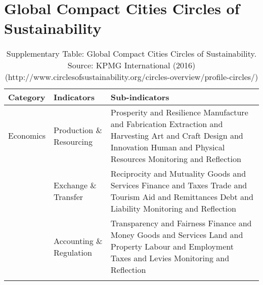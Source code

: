 
\chapter{Global Compact Cities Circles of Sustainability} %

\label{AppendixC} %

\begin{table}[th]
\caption{Supplementary Table: Global Compact Cities Circles of Sustainability. Source: KPMG International (2016) (http://www.circlesofsustainability.org/circles-overview/profile-circles/)}
\begin{center}
\begin{tabular}{ >{\raggedright\arraybackslash}p{} >{\raggedright\arraybackslash}p{} >{\raggedright\arraybackslash}p{} }
\hline
Category & Indicators & Sub-indicators \\
\hline
Economics & Production \& Resourcing & Prosperity and Resilience \linebreak Manufacture and Fabrication \linebreak Extraction and Harvesting \linebreak Art and Craft \linebreak Design and Innovation \linebreak Human and Physical Resources \linebreak Monitoring and Reflection \linebreak \\
  & Exchange \& Transfer & Reciprocity and Mutuality \linebreak Goods and Services \linebreak Finance and Taxes \linebreak Trade and Tourism \linebreak Aid and Remittances \linebreak Debt and Liability \linebreak Monitoring and Reflection  \linebreak \\
  & Accounting \& Regulation & Transparency and Fairness \linebreak Finance and Money \linebreak Goods and Services \linebreak Land and Property \linebreak Labour and Employment \linebreak Taxes and Levies \linebreak Monitoring and Reflection \\
\hline
\label{tbl:incomesByUfarmens0}
\end{tabular}
\end{center}
\end{table}

